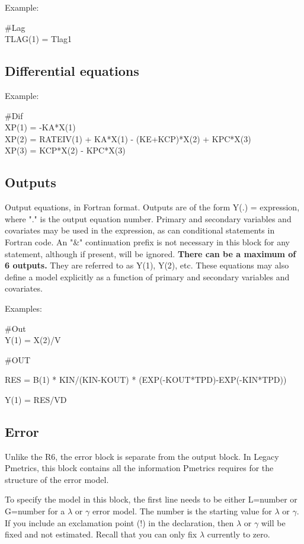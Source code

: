 \documentclass[
]{book}
\begin{document}
Example:

\#Lag\\
TLAG(1) = Tlag1

\hypertarget{dif}{%
\subsection{Differential equations}\label{dif}}

Example:

\#Dif\\
XP(1) = -KA*X(1)\\
XP(2) = RATEIV(1) + KA*X(1) - (KE+KCP)*X(2) + KPC*X(3)\\
XP(3) = KCP*X(2) - KPC*X(3)

\hypertarget{out}{%
\subsection{Outputs}\label{out}}

Output equations, in Fortran format. Outputs are of the form Y(.) =
expression, where "." is the output equation number. Primary and
secondary variables and covariates may be used in the expression, as can
conditional statements in Fortran code. An "\&" continuation prefix is
not necessary in this block for any statement, although if present, will
be ignored. \textbf{There can be a maximum of 6 outputs.} They are referred
to as Y(1), Y(2), etc. These equations may also define a model
explicitly as a function of primary and secondary variables and
covariates.

Examples:

\#Out\\
Y(1) = X(2)/V

\#OUT

RES = B(1) * KIN/(KIN-KOUT) * (EXP(-KOUT*TPD)-EXP(-KIN*TPD))

Y(1) = RES/VD

\hypertarget{err}{%
\subsection{Error}\label{err}}

Unlike the R6, the error block is separate from the output block. In Legacy Pmetrics, this block contains all the information Pmetrics requires for the
structure of the error model.

To specify the model in this block, the first line needs to be either
L=number or G=number for a \(\lambda\) or \(\gamma\) error model. The
number is the starting value for \(\lambda\) or \(\gamma\). If you include an exclamation point (!) in the declaration,
then \(\lambda\) or \(\gamma\) will be fixed and not estimated. Recall that you can
only fix \(\lambda\) currently to zero.
\end{document}
